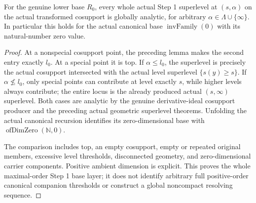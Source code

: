 \begin{theorem}
\label{hir:step-one-dimzero-all-superlevels}
\leanok
For the genuine lower base $R_0$, every whole actual Step 1 superlevel
at $(s,\alpha)$ on the actual transformed cosupport is globally
analytic, for arbitrary $\alpha\in\Lambda\cup\{\infty\}$. In
particular this holds for the actual canonical base
$\operatorname{invFamily}(0)$ with its natural-number zero value.
\end{theorem}
\begin{proof}
At a nonspecial cosupport point, the preceding lemma makes the second
entry exactly $l_0$. At a special point it is top. If
$\alpha\le l_0$, the superlevel is precisely the actual cosupport
intersected with the actual level superlevel $\{s(y)\ge s\}$.
If $\alpha\nleq l_0$, only special points can contribute at level
exactly $s$, while higher levels always contribute; the entire locus
is the already produced actual $(s,\infty)$ superlevel. Both cases
are analytic by the genuine derivative-ideal cosupport producer and
the preceding actual geometric superlevel theorems. Unfolding the
actual canonical recursion identifies its zero-dimensional base with
$\operatorname{ofDimZero}(\mathbb N,0)$.

The comparison includes top, an empty cosupport, empty or repeated
original members, excessive level thresholds, disconnected geometry,
and zero-dimensional carrier components. Positive ambient dimension
is explicit. This proves the whole maximal-order Step 1 base layer;
it does not identify arbitrary full positive-order canonical companion
thresholds or construct a global noncompact resolving sequence.
\end{proof}

